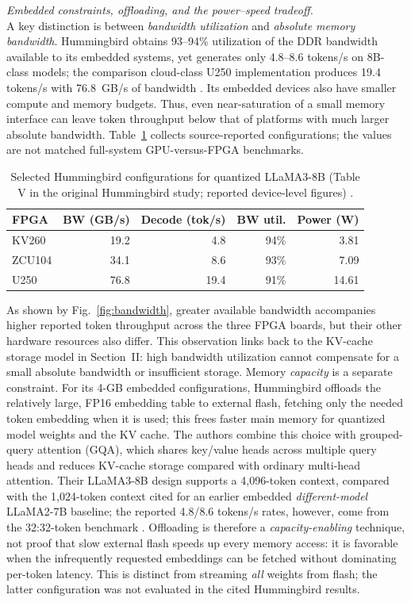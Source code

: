 \par\noindent\textit{Embedded constraints, offloading, and the power--speed tradeoff.}\\ 
A key distinction is between \emph{bandwidth utilization} and \emph{absolute memory bandwidth}. Hummingbird obtains 93--94\% utilization of the DDR bandwidth available to its embedded systems, yet generates only 4.8--8.6 tokens/s on 8B-class models; the comparison cloud-class U250 implementation produces 19.4 tokens/s with 76.8~GB/s of bandwidth \cite{li2025hummingbird}. Its embedded devices also have smaller compute and memory budgets. Thus, even near-saturation of a small memory interface can leave token throughput below that of platforms with much larger absolute bandwidth. Table~\ref{tab:embedded} collects source-reported configurations; the values are not matched full-system GPU-versus-FPGA benchmarks.

\begin{table}[t]
\caption{Selected Hummingbird configurations for quantized LLaMA3-8B (Table V in the original Hummingbird study; reported device-level figures) \cite{li2025hummingbird}.}
\label{tab:embedded}
\centering\footnotesize
\begin{tabular}{lrrrr}
\hline
FPGA & BW (GB/s) & Decode (tok/s) & BW util. & Power (W)\\ \hline
KV260 & 19.2 & 4.8 & 94\% & 3.81\\
ZCU104 & 34.1 & 8.6 & 93\% & 7.09\\
U250 & 76.8 & 19.4 & 91\% & 14.61\\ \hline
\end{tabular}
\end{table}

As shown by Fig.~\ref{fig:bandwidth}, greater available bandwidth accompanies higher reported token throughput across the three FPGA boards, but their other hardware resources also differ. This observation links back to the KV-cache storage model in Section~II: high bandwidth utilization cannot compensate for a small absolute bandwidth or insufficient storage. Memory \emph{capacity} is a separate constraint. For its 4-GB embedded configurations, Hummingbird offloads the relatively large, FP16 embedding table to external flash, fetching only the needed token embedding when it is used; this frees faster main memory for quantized model weights and the KV cache. The authors combine this choice with grouped-query attention (GQA), which shares key/value heads across multiple query heads and reduces KV-cache storage compared with ordinary multi-head attention. Their LLaMA3-8B design supports a 4,096-token context, compared with the 1,024-token context cited for an earlier embedded \emph{different-model} LLaMA2-7B baseline; the reported 4.8/8.6 tokens/s rates, however, come from the 32:32-token benchmark \cite{li2025hummingbird}. Offloading is therefore a \emph{capacity-enabling} technique, not proof that slow external flash speeds up every memory access: it is favorable when the infrequently requested embeddings can be fetched without dominating per-token latency. This is distinct from streaming \emph{all} weights from flash; the latter configuration was not evaluated in the cited Hummingbird results.

